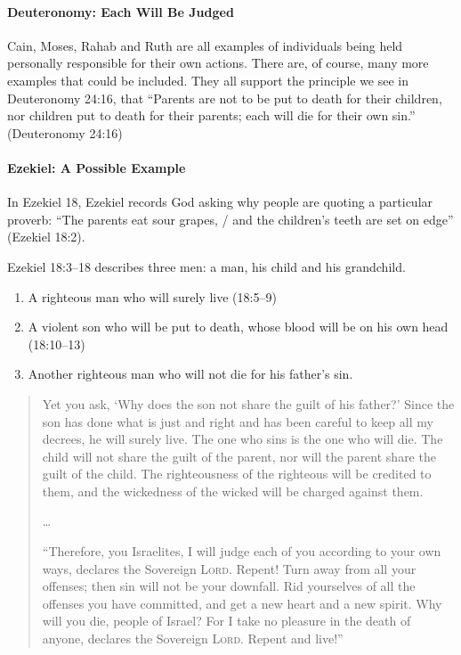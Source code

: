 \paragraph{Deuteronomy: Each Will Be Judged} Cain, Moses, Rahab and Ruth are all
examples of individuals being held personally responsible for their own actions.
There are, of course, many more examples that could be included. They all
support the principle we see in Deuteronomy 24:16, that \enquote{Parents are not
to be put to death for their children, nor children put to death for their
parents; each will die for their own sin.} (Deuteronomy 24:16)

\paragraph{Ezekiel: A Possible Example}

In Ezekiel 18, Ezekiel records God asking why people are quoting a particular
proverb: \enquote{The parents eat sour grapes, / and the children's teeth are
set on edge} (Ezekiel 18:2).

Ezekiel 18:3--18 describes three men: a man, his child and his grandchild.

\begin{enumerate}
    \item A righteous man who will surely live (18:5--9)
    \item A violent son who will be put to death, whose blood will be on his own
    head (18:10--13)
    \item Another righteous man who will not die for his father's sin.
\end{enumerate}

\begin{quote}
    \OpenQuote Yet you ask, \enquote*{Why does the son not share the guilt of his
    father?} Since the son has done what is just and right and has been careful
    to keep all my decrees, he will surely live. The one who sins is the one who
    will die. The child will not share the guilt of the parent, nor will the
    parent share the guilt of the child. The righteousness of the righteous will
    be credited to them, and the wickedness of the wicked will be charged
    against them.

    \dots

    \enquote{Therefore, you Israelites, I will judge each of you according to
    your own ways, declares the Sovereign \textsc{Lord}. Repent! Turn away from
    all your offenses; then sin will not be your downfall. Rid yourselves of all
    the offenses you have committed, and get a new heart and a new spirit. Why
    will you die, people of Israel? For I take no pleasure in the death of
    anyone, declares the Sovereign \textsc{Lord}. Repent and live!}
\end{quote}


